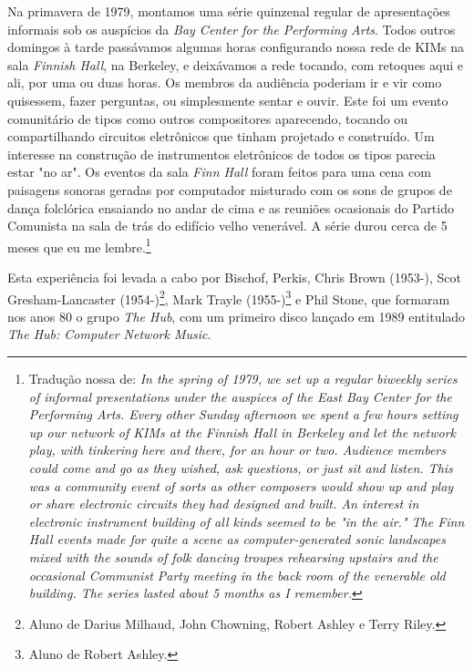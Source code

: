 \begin{citacao}
Na primavera de 1979, montamos uma série quinzenal regular de apresentações informais sob os auspícios da \emph{Bay Center for the Performing Arts}. Todos outros domingos à tarde passávamos algumas horas configurando nossa rede de KIMs na sala \emph{Finnish Hall}, na Berkeley, e deixávamos a rede tocando, com retoques aqui e ali, por uma ou duas horas. Os membros da audiência poderiam ir e vir como quisessem, fazer perguntas, ou simplesmente sentar e ouvir. Este foi um evento comunitário de tipos como outros compositores aparecendo, tocando ou compartilhando circuitos eletrônicos que tinham projetado e construído. Um interesse na construção de instrumentos eletrônicos de todos os tipos parecia estar "no ar". Os eventos da sala \emph{Finn Hall} foram feitos para uma cena com paisagens sonoras geradas por computador misturado com os sons de grupos de dança folclórica ensaiando no andar de cima e as reuniões ocasionais do Partido Comunista na sala de trás do edifício velho venerável. A série durou cerca de 5 meses que eu me lembre.\cite[online]{brown_indigenous_2013}\footnote{Tradução nossa de: \emph{In the spring of 1979, we set up a regular biweekly series of informal presentations under the auspices of the East Bay Center for the Performing Arts. Every other Sunday afternoon we spent a few hours setting up our network of KIMs at the Finnish Hall in Berkeley and let the network play, with tinkering here and there, for an hour or two. Audience members could come and go as they wished, ask questions, or just sit and listen. This was a community event of sorts as other composers would show up and play or share electronic circuits they had designed and built. An interest in electronic instrument building of all kinds seemed to be "in the air." The Finn Hall events made for quite a scene as computer-generated sonic landscapes mixed with the sounds of folk dancing troupes rehearsing upstairs and the occasional Communist Party meeting in the back room of the venerable old building. The series lasted about 5 months as I remember.}}
\end{citacao}

Esta experiência foi levada a cabo por Bischof, Perkis, Chris Brown (1953-), Scot Gresham-Lancaster (1954-)\footnote{Aluno de Darius Milhaud, John Chowning, Robert Ashley e Terry Riley.}, Mark Trayle (1955-)\footnote{Aluno de  Robert Ashley.} e Phil Stone, que formaram nos anos 80 o grupo \emph{The Hub}, com um primeiro disco lançado em 1989 entitulado \emph{The Hub: Computer Network Music}.

